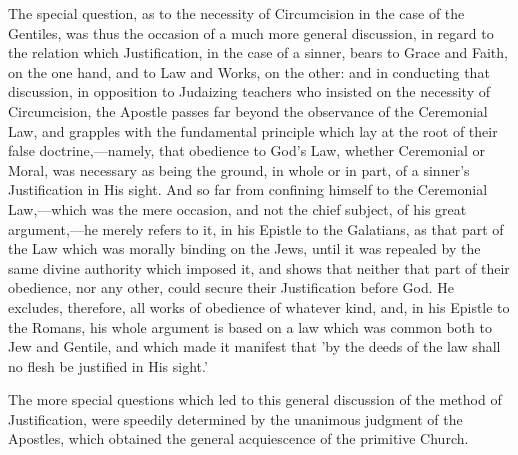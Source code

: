 \documentclass[
]{book}
\begin{document}
The special question, as to the necessity of Circumcision in the case of the Gentiles, was thus the occasion of a much more general discussion, in regard to the relation which Justification, in the case of a sinner, bears to Grace and Faith, on the one hand, and to Law and Works, on the other: and in conducting that discussion, in opposition to Judaizing teachers who insisted on the necessity of Circumcision, the Apostle passes far beyond the observance of the Ceremonial Law, and grapples with the fundamental principle which lay at the root of their false doctrine,---namely, that obedience to God's Law, whether Ceremonial or Moral, was necessary as being the ground, in whole or in part, of a sinner's Justification in His sight. And so far from confining himself to the Ceremonial Law,---which was the mere occasion, and not the chief subject, of his great argument,---he merely refers to it, in his Epistle to the Galatians, as that part of the Law which was morally binding on the Jews, until it was repealed by the same divine authority which imposed it, and shows that neither that part of their obedience, nor any other, could secure their Justification before God. He excludes, therefore, all works of obedience of whatever kind, and, in his Epistle to the Romans, his whole argument is based on a law which was common both to Jew and Gentile, and which made it manifest that 'by the deeds of the law shall no flesh be justified in His sight.'

The more special questions which led to this general discussion of the method of Justification, were speedily determined by the unanimous judgment of the Apostles, which obtained the general acquiescence of the primitive Church.
\end{document}
